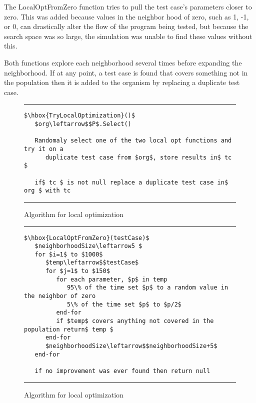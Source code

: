 \documentclass[runningheads]{llncs}
\begin{document}
The LocalOptFromZero function tries to pull the test case's parameters closer to zero. This was added because values in the neighbor hood of zero, such as 1, -1, or 0, can drastically alter the flow of the program being tested, but because the search space was so large, the simulation was unable to find these values without this.

Both functions explore each neighborhood several times before expanding the neighborhood. If at any point, a test case is found that covers something not in the population then it is added to the organism by replacing a duplicate test case.


\begin{figure}[h!]
\begin{center}
\hrule
\medskip
\begin{Verbatim}[fontfamily=tt, xleftmargin=10pt, commandchars=\\\{\},
        codes={\catcode`$=3\catcode`^=7\catcode`_=8}]
$\hbox{TryLocalOptimization}()$
   $org\leftarrow$$P$.Select()
   
   Randomaly select one of the two local opt functions and try it on a 
      duplicate test case from $org$, store results in$ tc $
      
   if$ tc $ is not null replace a duplicate test case in$ org $ with tc
\end{Verbatim}
\hrule
\end{center}
\caption{Algorithm for local optimization \label{fig:lcOpt}}
\end{figure}

\begin{figure}[h!]
\begin{center}
\hrule
\medskip
\begin{Verbatim}[fontfamily=tt, xleftmargin=10pt, commandchars=\\\{\},
        codes={\catcode`$=3\catcode`^=7\catcode`_=8}]
$\hbox{LocalOptFromZero}(testCase)$
   $neighborhoodSize\leftarrow5 $
   for $i=1$ to $1000$ 
      $temp\leftarrow$$testCase$
      for $j=1$ to $150$
         for each parameter, $p$ in temp
            95\% of the time set $p$ to a random value in the neighbor of zero
            5\% of the time set $p$ to $p/2$
         end-for     
         if $temp$ covers anything not covered in the population return$ temp $
      end-for
      $neighborhoodSize\leftarrow$$neighborhoodSize+5$
   end-for
   
   if no improvement was ever found then return null
\end{Verbatim}
\hrule
\end{center}
\caption{Algorithm for local optimization \label{fig:lcOptFZ}}
\end{figure}
\end{document}
